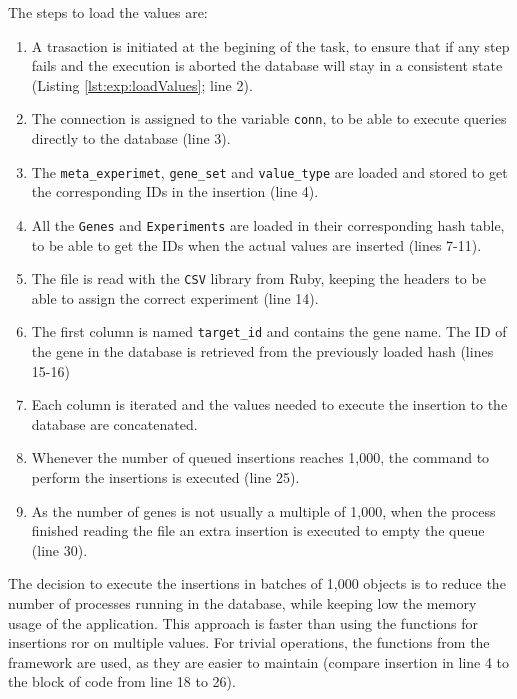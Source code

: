 The steps to load the values are:
\begin{enumerate}
\item A trasaction is initiated at the begining of the task, to ensure that if any step fails and the execution is aborted the database will stay in a consistent state (Listing \ref{lst:exp:loadValues}; line 2).
\item The connection is assigned to the variable \verb|conn|, to be able to execute queries directly to the database (line 3).   
\item The \verb|meta_experimet|, \verb|gene_set| and \verb|value_type| are loaded and stored to get the corresponding IDs in the insertion (line 4).
\item All the \verb|Genes| and \verb|Experiments| are loaded in their corresponding hash table, to be able to get the IDs when the actual values are inserted (lines 7-11). 
\item The file is read with the \verb|CSV| library from Ruby, keeping the headers to be able to assign the correct experiment (line 14). 
\item The first column is named \verb|target_id| and contains the gene name. The ID of the gene  in the database is retrieved from the previously loaded hash (lines 15-16)
\item Each column is iterated and the values needed to execute the insertion to the database are concatenated. 
\item Whenever the number of queued insertions reaches 1,000, the command to perform the insertions is executed (line 25). 
\item As the number of genes is not usually a multiple of 1,000, when the process finished reading the file an extra insertion is executed to empty the queue (line 30).
\end{enumerate}

The decision to execute the insertions in batches of 1,000 objects is to reduce the number of processes running in the database, while keeping low the memory usage of the application. 
This approach is faster than using the functions for insertions \acrshort{ror} on multiple values. 
For trivial operations, the functions from the framework are used, as they are easier to maintain (compare insertion in line 4 to the block of code from line 18 to 26). 

